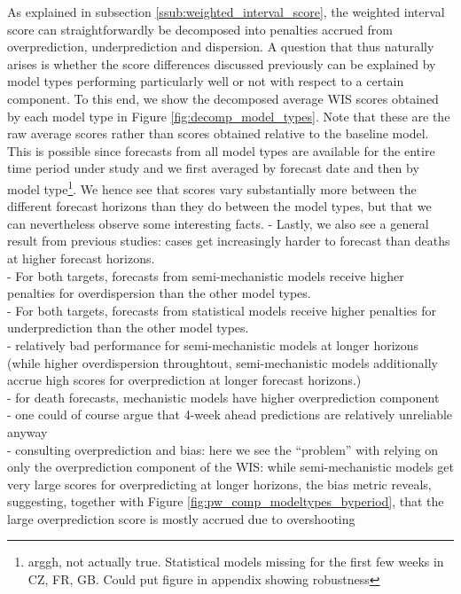 As explained in subsection \ref{ssub:weighted_interval_score}, the weighted interval score can straightforwardly be decomposed into penalties accrued from overprediction, underprediction and dispersion. A question that thus naturally arises is whether the score differences discussed previously can be explained by model types performing particularly well or not with respect to a certain component. To this end, we show the decomposed average WIS scores obtained by each model type in Figure \ref{fig:decomp_model_types}. Note that these are the raw average scores rather than scores obtained relative to the baseline model. This is possible since forecasts from all model types are available for the entire time period under study and we first averaged by forecast date and then by model type\footnote{arggh, not actually true. Statistical models missing for the first few weeks in CZ, FR, GB. Could put figure in appendix showing robustness}. We hence see that scores vary substantially more between the different forecast horizons than they do between the model types, but that we can nevertheless observe some interesting facts. 
- Lastly, we also see a general result from previous studies: cases get increasingly harder to forecast than deaths at higher forecast horizons.\\
- For both targets, forecasts from semi-mechanistic models receive higher penalties for overdispersion than the other model types.\\
- For both targets, forecasts from statistical models receive higher penalties for underprediction than the other model types.\\
- relatively bad performance for semi-mechanistic models at longer horizons (while higher overdispersion throughtout, semi-mechanistic models additionally accrue high scores for overprediction at longer forecast horizons.)\\
- for death forecasts, mechanistic models have higher overprediction component\\
- one could of course argue that 4-week ahead predictions are relatively unreliable anyway \\
- consulting overprediction and bias: here we see the ``problem'' with relying on only the overprediction component of the WIS: while semi-mechanistic models get very large scores for overpredicting at longer horizons, the bias metric reveals, suggesting, together with Figure \ref{fig:pw_comp_modeltypes_byperiod}, that the large overprediction score is mostly accrued due to overshooting 
